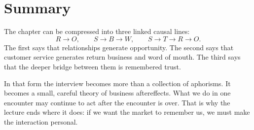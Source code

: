 \section{Summary}

The chapter can be compressed into three linked causal lines:
\[
R \to O,
\qquad
S \to B \to W,
\qquad
S \to T \to R \to O.
\]
The first says that relationships generate opportunity. The second says that customer service generates return business and word of mouth. The third says that the deeper bridge between them is remembered trust.

In that form the interview becomes more than a collection of aphorisms. It becomes a small, careful theory of business aftereffects. What we do in one encounter may continue to act after the encounter is over. That is why the lecture ends where it does: if we want the market to remember us, we must make the interaction personal.
